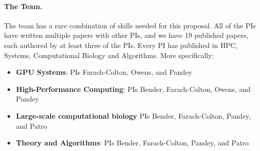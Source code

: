 
\paragraph{The Team.}
The team has a rare combination of skills needed for this proposal.    All of the PIs have written multiple papers with other PIs, and we have 19 published papers, each authored by at least three  of the PIs.
 Every PI has published in HPC, Systems, Computational Biology and Algorithms.  More specifically:


\begin{itemize}%
    \item \textbf{GPU Systems}: PIs Farach-Colton, Owens, and Pandey

    \item \textbf{High-Performance Computing}: PIs Bender, Farach-Colton, Owens, and Pandey

    \item \textbf{Large-scale computational biology} PIs Bender, Farach-Colton, Pandey, and Patro

        \item \textbf{Theory and Algorithms}: PIs Bender, Farach-Colton, Pandey, and Patro
    

\end{itemize}


